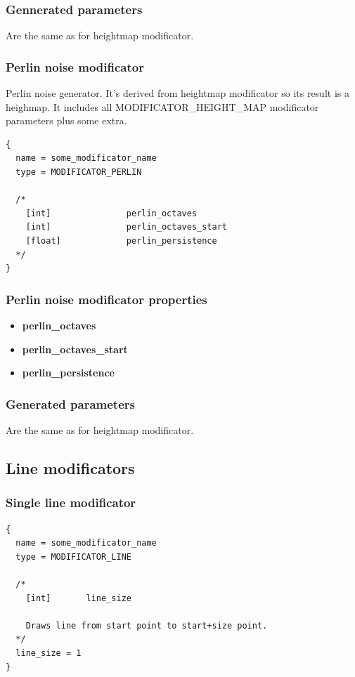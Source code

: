 \documentclass[9pt]{article}
\begin{document}
\subsubsection*{Gennerated parameters}

Are the same as for heightmap modificator.

\subsubsection{Perlin noise modificator}

Perlin noise generator. It's derived from heightmap modificator
so its result is a heighmap. It includes all MODIFICATOR\_HEIGHT\_MAP modificator 
parameters plus some extra.

\begin{verbatim}
{
  name = some_modificator_name
  type = MODIFICATOR_PERLIN

  /*
    [int]               perlin_octaves
    [int]               perlin_octaves_start
    [float]             perlin_persistence
  */
}
\end{verbatim}
\subsubsection*{Perlin noise modificator properties}
\begin{itemize}
\item{\bf perlin\_octaves}
\item{\bf perlin\_octaves\_start}
\item{\bf perlin\_persistence}
\end{itemize}

\subsubsection*{Generated parameters}
Are the same as for heightmap modificator.

\subsection{Line modificators}
\subsubsection{Single line modificator}

\begin{verbatim}
{
  name = some_modificator_name
  type = MODIFICATOR_LINE

  /*
    [int]       line_size
    
    Draws line from start point to start+size point.
  */
  line_size = 1
}
\end{verbatim}
\end{document}
